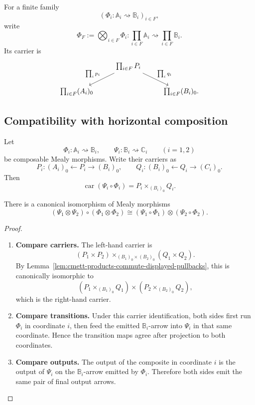 For a finite family
\[
    (\Phi_i:\mathbb A_i\rightsquigarrow\mathbb B_i)_{i\in F},
\]
write
\[
    \Phi_F:=\bigotimes_{i\in F}\Phi_i:
    \prod_{i\in F}\mathbb A_i
    \rightsquigarrow
    \prod_{i\in F}\mathbb B_i.
\]
Its carrier is
\[
\begin{tikzcd}
&
\prod_{i\in F}P_i
    \arrow[dl,"\prod_i p_i"']
    \arrow[dr,"\prod_i q_i"]
&
\\
\prod_{i\in F}(A_i)_0
&&
\prod_{i\in F}(B_i)_0 .
\end{tikzcd}
\]

\subsection{Compatibility with horizontal composition}
\label{subsec:cmett-tensor-horizontal-composition}

Let
\[
    \Phi_i:\mathbb A_i\rightsquigarrow\mathbb B_i,
    \qquad
    \Psi_i:\mathbb B_i\rightsquigarrow\mathbb C_i
    \qquad
    (i=1,2)
\]
be composable Mealy morphisms. Write their carriers as
\[
    P_i:(A_i)_0\leftarrow P_i\to(B_i)_0,
    \qquad
    Q_i:(B_i)_0\leftarrow Q_i\to(C_i)_0.
\]
Then
\[
    \operatorname{car}(\Psi_i\circ\Phi_i)
    =
    P_i\times_{(B_i)_0}Q_i.
\]

\begin{proposition}
\label{prop:cmett-tensor-horizontal-interchange}
    There is a canonical isomorphism of Mealy morphisms
    \[
        (\Psi_1\otimes\Psi_2)\circ(\Phi_1\otimes\Phi_2)
        \cong
        (\Psi_1\circ\Phi_1)\otimes(\Psi_2\circ\Phi_2).
    \]
\end{proposition}

\begin{proof}
    \leavevmode
    \begin{enumerate}
        \item \textbf{Compare carriers.}
        The left-hand carrier is
        \[
            (P_1\times P_2)
            \times_{(B_1)_0\times(B_2)_0}
            (Q_1\times Q_2).
        \]
        By Lemma~\ref{lem:cmett-products-commute-displayed-pullbacks}, this
        is canonically isomorphic to
        \[
            (P_1\times_{(B_1)_0}Q_1)
            \times
            (P_2\times_{(B_2)_0}Q_2),
        \]
        which is the right-hand carrier.

        \item \textbf{Compare transitions.}
        Under this carrier identification, both sides first run
        \(\Phi_i\) in coordinate \(i\), then feed the emitted
        \(\mathbb B_i\)-arrow into \(\Psi_i\) in that same coordinate.
        Hence the transition maps agree after projection to both coordinates.

        \item \textbf{Compare outputs.}
        The output of the composite in coordinate \(i\) is the output of
        \(\Psi_i\) on the \(\mathbb B_i\)-arrow emitted by \(\Phi_i\).
        Therefore both sides emit the same pair of final output arrows.
    \end{enumerate}
\end{proof}

